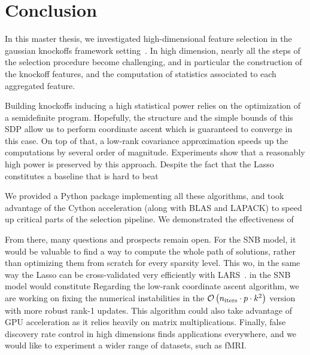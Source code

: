 \cleardoublepage
\chapter*{Conclusion}

In this master thesis,
we investigated high-dimensional feature selection
in the gaussian knockoffs framework setting~\citep{model_x_knockoffs}.
In high dimension, nearly all the steps of the selection procedure become challenging,
and in particular the construction of the knockoff features,
and the computation of statistics associated to each aggregated feature.

Building knockoffs inducing a high statistical power relies on the optimization of a semidefinite program.
Hopefully, the structure and the simple bounds of this SDP allow us to perform coordinate ascent which
is guaranteed to converge in this case.
On top of that, a low-rank covariance approximation speeds up the computations by several order of magnitude.
Experiments show that a reasonably high power is preserved by this approach.
Despite the fact that the Lasso constitutes a baseline that is hard to beat

We provided a Python package implementing all these algorithms,
and took advantage of the Cython acceleration (along with BLAS and LAPACK)
to speed up critical parts of the selection pipeline.
We demonstrated the effectiveness of

From there, many questions and prospects remain open.
For the SNB model,
it would be valuable to find a way to compute the whole path of solutions,
rather than optimizing them from scratch for every sparsity level.
This wo,
in the same way the Lasso can be cross-validated very efficiently with LARS~\cite{lars}.
in the SNB model would constitute
Regarding the low-rank coordinate ascent algorithm,
we are working on fixing the numerical instabilities in the
$\mathcal{O}\left( n_\text{iters} \cdot p \cdot k^2 \right)$ version with more robust rank-1 updates.
This algorithm could also take advantage of GPU acceleration
as it relies heavily on matrix multiplications.
Finally, false discovery rate control in high dimensions finds applications everywhere,
and we would like to experiment a wider range of datasets,
such as fMRI\@.
